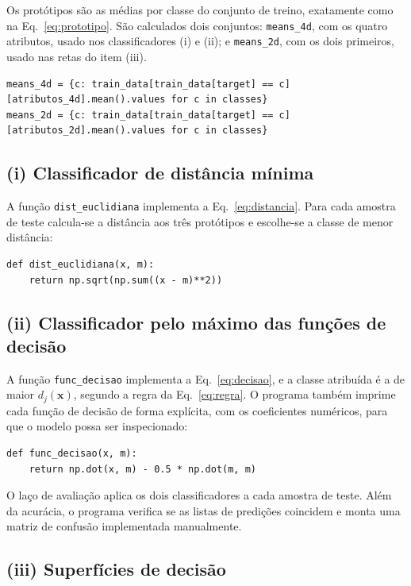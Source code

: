 \documentclass[12pt,a4paper]{article}
\begin{document}
Os protótipos são as médias por classe do conjunto de treino, exatamente como na Eq.~\eqref{eq:prototipo}. São calculados dois conjuntos: \texttt{means\_4d}, com os quatro atributos, usado nos classificadores (i) e (ii); e \texttt{means\_2d}, com os dois primeiros, usado nas retas do item (iii).

\begin{lstlisting}[firstnumber=32]
means_4d = {c: train_data[train_data[target] == c][atributos_4d].mean().values for c in classes}
means_2d = {c: train_data[train_data[target] == c][atributos_2d].mean().values for c in classes}
\end{lstlisting}

\subsection{(i) Classificador de distância mínima}

A função \texttt{dist\_euclidiana} implementa a Eq.~\eqref{eq:distancia}. Para cada amostra de teste calcula-se a distância aos três protótipos e escolhe-se a classe de menor distância:

\begin{lstlisting}[firstnumber=41]
def dist_euclidiana(x, m):
    return np.sqrt(np.sum((x - m)**2))
\end{lstlisting}

\subsection{(ii) Classificador pelo máximo das funções de decisão}

A função \texttt{func\_decisao} implementa a Eq.~\eqref{eq:decisao}, e a classe atribuída é a de maior $d_j(\mathbf{x})$, segundo a regra da Eq.~\eqref{eq:regra}. O programa também imprime cada função de decisão de forma explícita, com os coeficientes numéricos, para que o modelo possa ser inspecionado:

\begin{lstlisting}[firstnumber=49]
def func_decisao(x, m):
    return np.dot(x, m) - 0.5 * np.dot(m, m)
\end{lstlisting}

O laço de avaliação aplica os dois classificadores a cada amostra de teste. Além da acurácia, o programa verifica se as listas de predições coincidem e monta uma matriz de confusão implementada manualmente.

\subsection{(iii) Superfícies de decisão}
\end{document}
